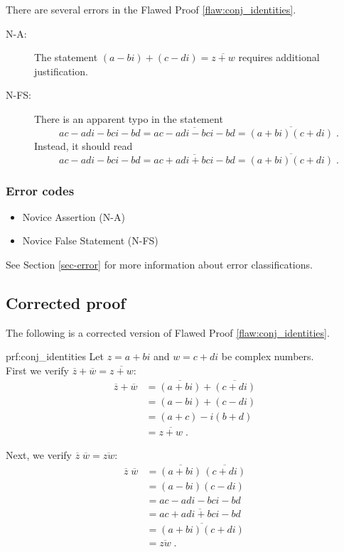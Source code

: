
There are several errors
 in the Flawed Proof \ref{flaw:conj_identities}. %


 \begin{description}
 	\item[N-A:] The statement $(a-bi) + (c-di) =\overline{z+w}$ requires additional justification.
    \item[N-FS:] There is an apparent typo in the statement $$ac - adi - bci - bd = \overline{ac - adi - bci - bd} = \overline{(a+bi)(c+di)}\;.$$ Instead, it should read $$ac - adi - bci - bd = \overline{ac + adi + bci - bd} = \overline{(a+bi)(c+di)}\;.$$
 \end{description}


\subsubsection{Error codes}
\begin{itemize}
	\item 	Novice Assertion (N-A)
	\item   Novice False Statement (N-FS)
\end{itemize}
See Section \ref{sec-error} for more information about error classifications.

\clearpage
\subsection{Corrected proof}

The following is a corrected version of Flawed Proof \ref{flaw:conj_identities}. %

\begin{prf}{prf:conj_identities} %
Let $z=a+bi$ and $w=c+di$ be complex numbers. \\

First we verify $\overline{z} + \overline{w} = \overline{z+w}$:
\begin{align*}
    \overline{z} + \overline{w} &= \overline{(a+bi)} + \overline{(c+di)} \\
    &= (a-bi) + (c-di) \\
    &= (a+c) - i(b+d) \\
    &= \overline{z+w}\;.
\end{align*}

Next, we verify $\overline{z}\; \overline{w} = \overline{zw}$:
\begin{align*}
    \overline{z}\;\overline{w} &= \overline{(a+bi)}\, \overline{(c+di)} \\
    &= (a-bi)(c-di) \\
    &= ac - adi - bci - bd\\
    &= \overline{ac + adi + bci - bd}\\
    &= \overline{(a+bi)(c+di)} \\
    &= \overline{zw}\;.
\end{align*}
\end{prf}

